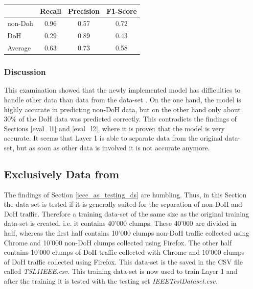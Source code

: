 \begin{center}
\begin{longtable}{ |l|c|c|c| }
\hline
 & Recall & Precision & F1-Score \\
\hline
non-Doh & 0.96 & 0.57 & 0.72 \\
\hline
DoH & 0.29 & 0.89 & 0.43 \\
\hline
Average & 0.63 & 0.73 & 0.58 \\ 
\hline
\end{longtable}
\label{tab:rpf1l1_i3e_testds}
\end{center}

\subsubsection{Discussion}
This examination showed that the newly implemented model has difficulties to handle other data than data from the data-set \cite{CIRA-CIC-DoHBrw-2020}. On the one hand, the model is highly accurate in predicting non-DoH data, but on the other hand only about 30\% of the DoH data was predicted correctly. This contradicts the findings of Sections \ref{eval_l1} and \ref{eval_l2}, where it is proven that the model is very accurate. It seems that Layer 1 is able to separate data from the original data-set, but as soon as other data is involved it is not accurate anymore.

\subsection{Exclusively Data from \cite{ieee_dataset}} \label{exclusive_data}
The findings of Section \ref{ieee_as_testing_ds} are humbling. Thus, in this Section the data-set \cite{ieee_dataset} is tested if it is generally suited for the separation of non-DoH and DoH traffic. Therefore a training data-set of the same size as the original training data-set is created, i.e. it contains 40'000 clumps. These 40'000 are divided in half, whereas the first half contains 10'000 clumps non-DoH traffic collected using Chrome and 10'000 non-DoH clumps collected using Firefox. The other half contains 10'000 clumps of DoH traffic collected with Chrome and 10'000 clumps of DoH traffic collected using Firefox. This data-set is the saved in the CSV file called \textit{TSL1IEEE.csv}. This training data-set is now used to train Layer 1 and after the training it is tested with the testing set \textit{IEEETestDataset.csv}.

